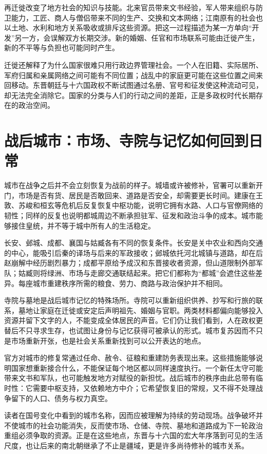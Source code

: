 再迁徙改变了地方社会的知识与技能。北来官员带来文书经验，军人带来组织与防卫能力，工匠、商人与僧侣带来不同的生产、交换和文本网络；江南原有的社会也以土地、水利和地方关系吸收或排斥这些资源。把这一过程描述为某一方单向“开发”另一方，会误解双方长期交涉。新的婚姻、任官和市场联系可能由迁徙产生，新的不平等与负担也可能同时产生。

迁徙还解释了为什么国家很难只用行政边界管理社会。一个人在旧籍、实际居所、军府归属和亲属网络之间可能有不同位置；战乱中的家庭更可能在这些位置之间来回移动。东晋朝廷与十六国政权不断试图通过名册、官号和征发使这种流动可见，却无法完全消除它。国家的分类与人们的行动之间的差距，正是多政权时代长期存在的政治空间。

\section{战后城市：市场、寺院与记忆如何回到日常}
\label{sec:eastern-jin-depth-after-war-cities}

城市在战争之后并不会立刻恢复为战前的样子。城墙或许被修补，官署可以重新开门，市场是否有货、居民是否敢回来、道路是否安全，却需要更长时间。建康在王敦、苏峻和桓玄等危机后反复恢复中枢功能，说明它拥有水路、人口与官僚网络的韧性；同样的反复也说明都城周边不断承担驻军、征发和政治斗争的成本。城市能够接住皇统，并不等于城中所有人的生活稳定。

长安、邺城、成都、襄国与姑臧各有不同的恢复条件。长安是关中农业和西向交通的中心，能吸引后秦的译场与后来的军政接收；邺城依托河北城镇与道路，却在后赵崩解中经历剧烈暴力；成都平原给予成汉和东晋接收者资源，但山道限制外部军队；姑臧则将绿洲、市场与走廊交通联结起来。把它们都称为“都城”会遮住这些差异。每座城市重建秩序所需的粮食、劳力、商路与政治保护并不相同。

寺院与墓地是战后城市记忆的特殊场所。寺院可以重新组织供养、抄写和行旅的联系，墓地让家庭在迁徙或安定后声明祖先、婚姻与官职。两类材料都偏向能够投入资源并留下文字的人，不能变成全体居民的声音。它们仍让我们看到，人在政权更替后不只寻求生存，也试图让身份与记忆获得可被承认的形式。城市复苏因而不只是市场重新开张，也是社会关系重新找到可以公开表达的地点。

官方对城市的修复常通过任命、赦令、征粮和重建防务表现出来。这些措施能够说明国家想重新接合什么，不能保证每个地区都以同样速度执行。一个新任太守可能带来文书和军队，也可能触发地方对赋役的新担忧。战后城市的秩序由此总带有临时性：它需要中枢支持，又依赖地方中介；它希望恢复旧的常规，又不得不处理战争留下的人口、债务与权力真空。

读者在国号变化中看到的城市名称，因而应被理解为持续的劳动现场。战争破坏并不使城市的社会功能消失，反而使市场、仓储、寺院、墓地和道路成为下一轮政治重组必须争取的资源。正是在这些地点，东晋与十六国的宏大年序落到可见的生活尺度，也让后来的南北朝继承了不止是疆域，更是许多尚待修补的城市关系。

